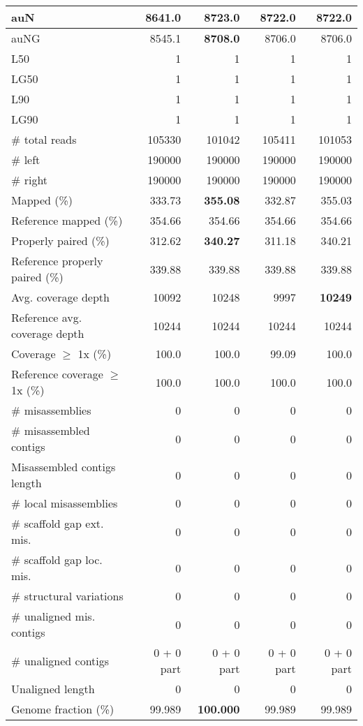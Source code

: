 \documentclass[12pt,a4paper]{article}
\begin{document}
\begin{table}[ht]
\begin{center}
\begin{tabular}{|l*{4}{|r}|}
auN & 8641.0 & {\bf 8723.0} & 8722.0 & 8722.0 \\ \hline
auNG & 8545.1 & {\bf 8708.0} & 8706.0 & 8706.0 \\ \hline
L50 & 1 & 1 & 1 & 1 \\ \hline
LG50 & 1 & 1 & 1 & 1 \\ \hline
L90 & 1 & 1 & 1 & 1 \\ \hline
LG90 & 1 & 1 & 1 & 1 \\ \hline
\# total reads & 105330 & 101042 & 105411 & 101053 \\ \hline
\# left & 190000 & 190000 & 190000 & 190000 \\ \hline
\# right & 190000 & 190000 & 190000 & 190000 \\ \hline
Mapped (\%) & 333.73 & {\bf 355.08} & 332.87 & 355.03 \\ \hline
Reference mapped (\%) & 354.66 & 354.66 & 354.66 & 354.66 \\ \hline
Properly paired (\%) & 312.62 & {\bf 340.27} & 311.18 & 340.21 \\ \hline
Reference properly paired (\%) & 339.88 & 339.88 & 339.88 & 339.88 \\ \hline
Avg. coverage depth & 10092 & 10248 & 9997 & {\bf 10249} \\ \hline
Reference avg. coverage depth & 10244 & 10244 & 10244 & 10244 \\ \hline
Coverage $\geq$ 1x (\%) & 100.0 & 100.0 & 99.09 & 100.0 \\ \hline
Reference coverage $\geq$ 1x (\%) & 100.0 & 100.0 & 100.0 & 100.0 \\ \hline
\# misassemblies & 0 & 0 & 0 & 0 \\ \hline
\# misassembled contigs & 0 & 0 & 0 & 0 \\ \hline
Misassembled contigs length & 0 & 0 & 0 & 0 \\ \hline
\# local misassemblies & 0 & 0 & 0 & 0 \\ \hline
\# scaffold gap ext. mis. & 0 & 0 & 0 & 0 \\ \hline
\# scaffold gap loc. mis. & 0 & 0 & 0 & 0 \\ \hline
\# structural variations & 0 & 0 & 0 & 0 \\ \hline
\# unaligned mis. contigs & 0 & 0 & 0 & 0 \\ \hline
\# unaligned contigs & 0 + 0 part & 0 + 0 part & 0 + 0 part & 0 + 0 part \\ \hline
Unaligned length & 0 & 0 & 0 & 0 \\ \hline
Genome fraction (\%) & 99.989 & {\bf 100.000} & 99.989 & 99.989 \\ \hline

\end{tabular}
\end{center}
\end{table}
\end{document}
